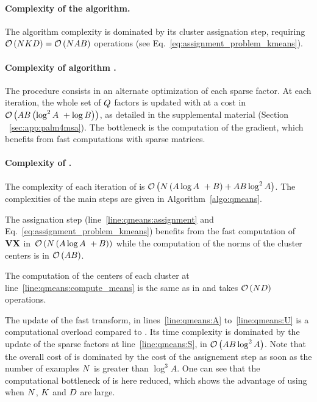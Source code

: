 \paragraph{Complexity of the \kmeans algorithm.}
The algorithm complexity is dominated by its cluster assignation step, requiring $\mathcal{O}\left(NKD\right)=\mathcal{O}\left(N A B\right)$ operations (see Eq.~\eqref{eq:assignment_problem_kmeans}).

\paragraph{Complexity of algorithm \palm.} The procedure consists in an alternate optimization of each sparse factor. 
At each iteration, the whole set of $Q$ factors is updated with at a cost in $\mathcal{O}\left(AB\left (\log^2 A~+\log B\right )\right)$, as detailed in the supplemental material (Section ~\ref{sec:app:palm4msa}). 
The bottleneck is the computation of the gradient, which benefits from fast computations with sparse matrices.


\paragraph{Complexity of \qkmeans.} The complexity of each iteration of \qkmeans is $\mathcal{O}\left(N\left(A\log A~+B\right ) + AB \log^2 A\right)$. The complexities of the main steps are given in Algorithm~\ref{algo:qmeans}. 

The assignation step (line~\ref{line:qmeans:assignment} and Eq.~\eqref{eq:assignment_problem_kmeans}) benefits from the fast computation of ${\mathbf{V}} {\mathbf{X}}$ in~$\mathcal{O}\left(N\left(A\log A~+B\right )\right)$ while the computation of the norms of the cluster centers is in $\mathcal{O}\left(AB\right)$.

The computation of the centers of each cluster at line~\ref{line:qmeans:compute_means} is the same as in \kmeans and takes $\mathcal{O}\left(ND\right)$ operations.

The update of the fast transform, in lines~\ref{line:qmeans:A} to~\ref{line:qmeans:U} is a computational overload compared to \kmeans. Its time complexity is dominated by the update of the sparse factors at line~\ref{line:qmeans:S}, in $\mathcal{O}\left(AB \log^2 A\right)$. 
Note that the overall cost of \qkmeans is dominated by the cost of the assignement step as soon as the number of examples $N$ is greater than $\log^3 A$. One can see that the computational bottleneck of \kmeans is here reduced, which shows the advantage of using \qkmeans when $N$, $K$ and $D$ are large.
